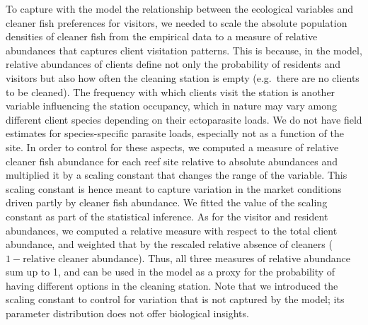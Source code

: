 \documentclass[
  12pt,
]{article}
\begin{document}
To capture with the model the relationship between the ecological
variables and cleaner fish preferences for visitors, we needed to scale
the absolute population densities of cleaner fish from the empirical
data to a measure of relative abundances that captures client visitation
patterns. This is because, in the model, relative abundances of clients
define not only the probability of residents and visitors but also how
often the cleaning station is empty (e.g.~there are no clients to be
cleaned). The frequency with which clients visit the station is another
variable influencing the station occupancy, which in nature may vary
among different client species depending on their ectoparasite loads. We
do not have field estimates for species-specific parasite loads,
especially not as a function of the site. In order to control for these
aspects, we computed a measure of relative cleaner fish abundance for
each reef site relative to absolute abundances and multiplied it by a
scaling constant that changes the range of the variable. This scaling
constant is hence meant to capture variation in the market conditions
driven partly by cleaner fish abundance. We fitted the value of the
scaling constant as part of the statistical inference. As for the
visitor and resident abundances, we computed a relative measure with
respect to the total client abundance, and weighted that by the rescaled
relative absence of cleaners (\(1-\text{relative cleaner abundance}\)).
Thus, all three measures of relative abundance sum up to 1, and can be
used in the model as a proxy for the probability of having different
options in the cleaning station. Note that we introduced the scaling
constant to control for variation that is not captured by the model; its
parameter distribution does not offer biological insights.
\end{document}
